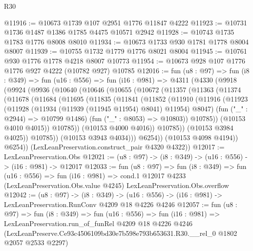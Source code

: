 \begin{lexlean}{R30}
\begin{coremodule}
@11916 := @10673 @1739 @107 @2951 @1776 @11847 @4222
@11923 := @10731 @1736 @1487 @1386 @1785 @4475 @10571 @2942
@11928 := @10743 @1735 @1783 @1776 @8008 @8010
@11934 := @10673 @1733 @930 @1781 @1778 @8004 @8007
@11939 := @10755 @1732 @1779 @1776 @8021 @8004
@11945 := @10761 @930 @1776 @1778 @4218 @8007 @10773
@11954 := @10673 @928 @107 @1776 @1776 @927 @4222 (@10782 @927) @10785
@12016 := fun (u8 : @97) =>
  fun (i8 : @349) =>
  fun (u16 : @556) =>
  fun (i16 : @981) =>
  @4311
    (@4330
      (@9918
        (@9924
          (@9936
            (@10640
              (@10646
                (@10655
                  (@10672
                    (@11357
                      (@11363
                        (@11374
                          (@11678
                            (@11684
                              (@11695
                                (@11835
                                  (@11841
                                    (@11852
                                      (@11910
                                        (@11916
                                          (@11923
                                            (@11928
                                              (@11934 (@11939 (@11945 @11954) @8041) @11954)
                                              @8047)
                                            (fun ("_" : @2944) => @10799 @1486)
                                            (fun ("_" : @8053) => @10803))
                                          @10785))
                                      (@10153 @4010 @4015))
                                    @10785))
                                (@10153 @4000 @4016))
                              @10785))
                          (@10153 @3984 @4025))
                        @10785))
                    (@10153 @3943 @4034)))
                @6254))
            (@10153 @4098 @4194))
          @6254))
      (LexLeanPreservation.construct_pair @4320 @4322))
@12017 := LexLeanPreservation.Obs
@12021 := (u8 : @97) -> (i8 : @349) -> (u16 : @556) -> (i16 : @981) -> @12017
@12033 := fun (u8 : @97) =>
  fun (i8 : @349) =>
  fun (u16 : @556) =>
  fun (i16 : @981) =>
  cond.{1} @12017 @4233 (LexLeanPreservation.Obs.value @4245) LexLeanPreservation.Obs.overflow
@12042 := (u8 : @97) ->
  (i8 : @349) -> (u16 : @556) -> (i16 : @981) -> LexLeanPreservation.RunConv @4209 @18 @4226 @4246
@12057 := fun (u8 : @97) =>
  fun (i8 : @349) =>
  fun (u16 : @556) =>
  fun (i16 : @981) =>
  LexLeanPreservation.run_of_funRel
    @4209
    @18
    @4226
    @4246
    (LexLeanPreserve.Ce93c4506109bd30e7b598e793b653631.R30.__rel_0 @1802 @2057 @2533 @2297)
\end{coremodule}
\end{lexlean}
